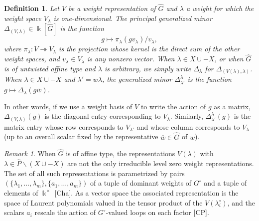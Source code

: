 \documentclass[12pt]{amsart}
\newcommand{\sayHW}[1]{\say[HW]{\color{violet}{\bf HW:}\;#1}}
\newcommand{\kk}{\Bbbk}%
\newcommand\onto{\twoheadrightarrow}
\newcommand{\ol}[1]{\overline{#1}}
\newtheorem{definition}[theorem]{Definition}
\theoremstyle{remark}
\newtheorem{remark}[theorem]{Remark}
\numberwithin{equation}{section}
\begin{document}
\begin{definition}
Let $V$ be a weight representation of $\widehat{G}$ and $\lambda$ a weight for which the weight space $V_\lambda$ is one-dimensional. The principal generalized minor $\Delta_{(V,\lambda)} \in \kk[\widehat{G}]$ is the function 
\[
g \mapsto \pi_\lambda(gv_\lambda)/v_\lambda,
\]
where $\pi_\lambda:V \onto V_\lambda$ is the projection whose kernel is the direct sum of the other weight spaces, and $v_\lambda \in V_\lambda$ is any nonzero vector. When $\lambda \in X \cup -X$, or when $\widehat{G}$ is of untwisted affine type and $\lambda$ is arbitrary, we simply write $\Delta_\lambda$ for $\Delta_{(V(\lambda),\lambda)}$. When $\lambda \in X \cup -X$ and $\lambda' = w \lambda$, the generalized minor $\Delta^{\lambda}_{\lambda'}$ is the function $g \mapsto \Delta_\lambda(g\ol{w})$. \sayHW{Check the exact formula} 
\end{definition}

In other words, if we use a weight basis of $V$ to write the action of $g$ as a matrix, $\Delta_{(V,\lambda)}(g)$ is the diagonal entry corresponding to $V_\lambda$. Similarly, $\Delta^{\lambda}_{\lambda'}(g)$ is the matrix entry whose row corresponds to $V_{\lambda'}$ and whose column corresponds to $V_{\lambda}$ (up to an overall scalar fixed by the representative $\ol{w} \in \widehat{G}$ of $w$).

\begin{remark}
When $\widehat{G}$ is of affine type, the representations $V(\lambda)$ with $\lambda \in \widehat{P}\smallsetminus(X \cup - X)$ are not the only irreducible level zero weight representations. The set of all such representations is parametrized by pairs $(\{\lambda_1,\dotsc,\lambda_m\},\{a_1,\dotsc,a_m\})$ of a tuple of dominant weights of $G^\circ$ and a tuple of elements of $\kk^\times$ [Cha]. As a vector space the associated representation is the space of Laurent polynomials valued in the tensor product of the $V(\lambda_i^\circ)$, and the scalars $a_i$ rescale the action of $G^\circ$-valued loops on each factor [CP].
\end{remark}
\end{document}
